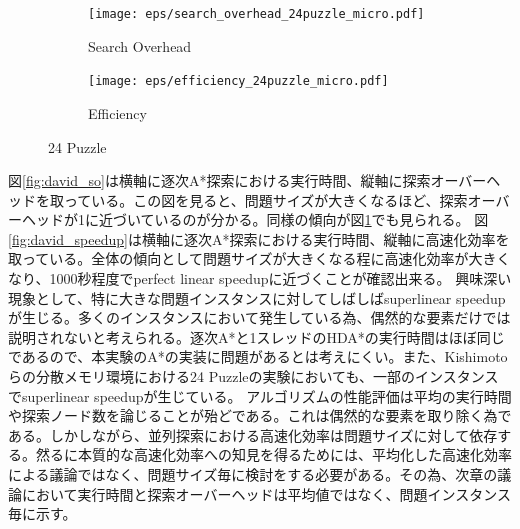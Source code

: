 \documentclass{jsarticle}
\begin{document}
\begin{figure}
	\centering
	\begin{subfigure}{0.45\columnwidth}
		\texttt{[image: eps/search\_overhead\_24puzzle\_micro.pdf]}	
		\caption{Search Overhead}
		\label{fig:david_so_24}
	\end{subfigure}
	\begin{subfigure}{0.45\columnwidth}
		\texttt{[image: eps/efficiency\_24puzzle\_micro.pdf]}	
		\caption{Efficiency}
		\label{fig:david_speedup_24}
	\end{subfigure}
	\caption{24 Puzzle}
	\label{fig:24_david}
\end{figure}
図\ref{fig:david_so}は横軸に逐次A*探索における実行時間、縦軸に探索オーバーヘッドを取っている。この図を見ると、問題サイズが大きくなるほど、探索オーバーヘッドが1に近づいているのが分かる。同様の傾向が図\ref{fig:david_so_24}でも見られる。
図\ref{fig:david_speedup}は横軸に逐次A*探索における実行時間、縦軸に高速化効率を取っている。全体の傾向として問題サイズが大きくなる程に高速化効率が大きくなり、1000秒程度でperfect linear speedupに近づくことが確認出来る。 %
興味深い現象として、特に大きな問題インスタンスに対してしばしばsuperlinear speedupが生じる。多くのインスタンスにおいて発生している為、偶然的な要素だけでは説明されないと考えられる。逐次A*と1スレッドのHDA*の実行時間はほぼ同じであるので、本実験のA*の実装に問題があるとは考えにくい。また、Kishimotoらの分散メモリ環境における24 Puzzleの実験においても、一部のインスタンスでsuperlinear speedupが生じている\cite{Kishimoto2013}。
アルゴリズムの性能評価は平均の実行時間や探索ノード数を論じることが殆どである。これは偶然的な要素を取り除く為である。しかしながら、並列探索における高速化効率は問題サイズに対して依存する。然るに本質的な高速化効率への知見を得るためには、平均化した高速化効率による議論ではなく、問題サイズ毎に検討をする必要がある。その為、次章の議論において実行時間と探索オーバーヘッドは平均値ではなく、問題インスタンス毎に示す。
\end{document}
